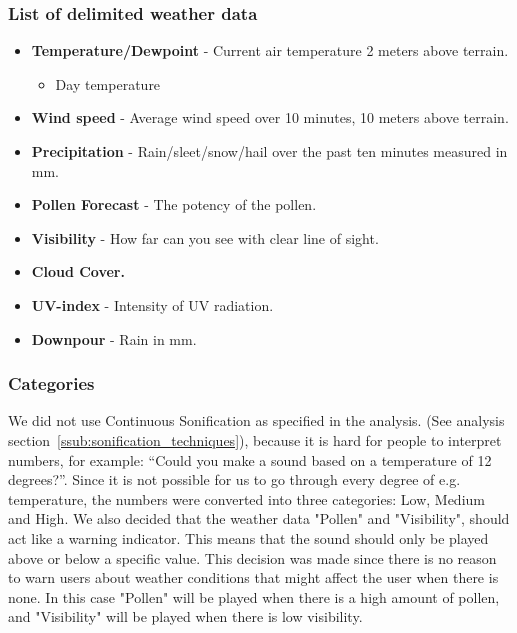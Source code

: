 \subsubsection*{List of delimited weather data} %
\label{ssub:list_of_delimited_weather_data}

\begin{itemize}
     \item \textbf{Temperature/Dewpoint} - Current air temperature 2 meters above terrain.
     \begin{itemize}
         \item Day temperature
     \end{itemize}
     \item \textbf{Wind speed} - Average wind speed over 10 minutes, 10 meters above terrain.
     \item \textbf{Precipitation} - Rain/sleet/snow/hail over the past ten minutes measured in mm.
     \item \textbf{Pollen Forecast} - The potency of the pollen.
     \item \textbf{Visibility} - How far can you see with clear line of sight.
     \item \textbf{Cloud Cover.}
     \item \textbf{UV-index} - Intensity of UV radiation.
     \item \textbf{Downpour} - Rain in mm.
 \end{itemize}



\subsubsection{Categories} %
\label{ssub:categories}


We did not use Continuous Sonification as specified in the analysis. (See analysis section~\ref{ssub:sonification_techniques}), because it is hard for people to interpret numbers, for example: \enquote{Could you make a sound based on a temperature of 12 degrees?}. 
Since it is not possible for us to go through every degree of e.g. temperature, the numbers were converted into three categories: Low, Medium and High. 
We also decided that the weather data "Pollen" and "Visibility", should act like a warning indicator. 
This means that the sound should only be played above or below a specific value.
This decision was made since there is no reason to warn users about weather conditions that might affect the user when there is none. 
In this case "Pollen" will be played when there is a high amount of pollen, and "Visibility" will be played when there is low visibility.

